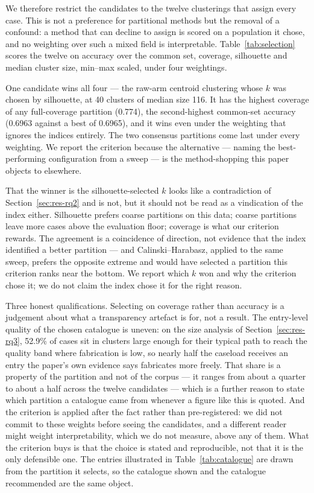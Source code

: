 We therefore restrict the candidates to the twelve clusterings that assign every case. This is
not a preference for partitional methods but the removal of a confound: a method that can
decline to assign is scored on a population it chose, and no weighting over such a mixed field
is interpretable. Table~\ref{tab:selection} scores the twelve on accuracy over the common set,
coverage, silhouette and median cluster size, min--max scaled, under four weightings.

One candidate wins all four --- the raw-arm centroid clustering whose $k$ was chosen by
silhouette, at 40 clusters of median size 116. It has the highest coverage of any full-coverage
partition (0.774), the second-highest common-set accuracy (0.6963 against a best of 0.6965), and
it wins even under the weighting that ignores the indices entirely. The two consensus partitions
come last under every weighting. We report the criterion because the alternative --- naming the
best-performing configuration from a sweep --- is the method-shopping this paper objects to
elsewhere.

That the winner is the silhouette-selected $k$ looks like a contradiction of
Section~\ref{sec:res-rq2} and is not, but it should not be read as a vindication of the index
either. Silhouette prefers coarse partitions on this data; coarse partitions leave more cases
above the evaluation floor; coverage is what our criterion rewards. The agreement is a
coincidence of direction, not evidence that the index identified a better partition --- and
Calinski--Harabasz, applied to the same sweep, prefers the opposite extreme and would have
selected a partition this criterion ranks near the bottom. We report which $k$ won and why the
criterion chose it; we do not claim the index chose it for the right reason.



Three honest qualifications. Selecting on coverage rather than accuracy is a judgement about what
a transparency artefact is for, not a result. The entry-level quality of the chosen catalogue is
uneven: on the size analysis of Section~\ref{sec:res-rq3}, 52.9\% of cases sit in clusters large
enough for their typical path to reach the quality band where fabrication is low, so nearly half
the caseload receives an entry the paper's own evidence says fabricates more freely. That share
is a property of the partition and not of the corpus --- it ranges from about a quarter to about
a half across the twelve candidates --- which is a further reason to state which partition a
catalogue came from whenever a figure like this is quoted. And the criterion is applied after the fact rather than pre-registered: we did not
commit to these weights before seeing the candidates, and a different reader might weight
interpretability, which we do not measure, above any of them. What the criterion buys is that
the choice is stated and reproducible, not that it is the only defensible one. The entries
illustrated in Table~\ref{tab:catalogue} are drawn from the partition it selects, so the
catalogue shown and the catalogue recommended are the same object.

